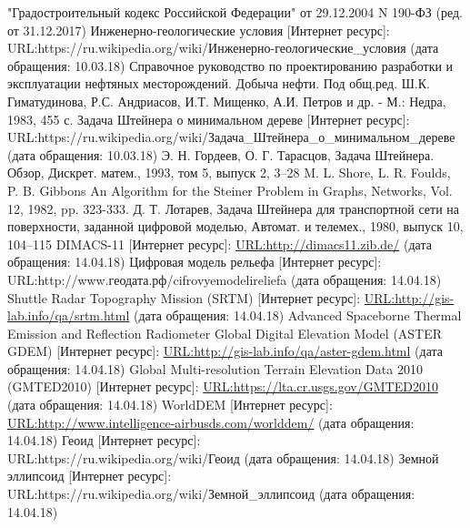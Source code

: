 \begin{thebibliography}{8}
	"Градостроительный кодекс Российской Федерации" от 29.12.2004 N 190-ФЗ (ред. от 31.12.2017)
	 Инженерно-геологические условия [Интернет ресурс]:\\
	URL:https://ru.wikipedia.org/wiki/Инженерно-геологические\_условия (дата обращения: 10.03.18)
	Справочное руководство по проектированию разработки и эксплуатации нефтяных месторождений. Добыча нефти. Под общ.ред. Ш.К. Гиматудинова, Р.С. Андриасов, И.Т. Мищенко, А.И. Петров и др. - М.: Недра, 1983, 455 с.
	 Задача Штейнера о минимальном дереве [Интернет ресурс]:\\
	URL:https://ru.wikipedia.org/wiki/Задача\_Штейнера\_о\_минимальном\_дереве (дата обращения: 10.03.18)
	Э. Н. Гордеев, О. Г. Тарасцов, Задача Штейнера. Обзор,	Дискрет. матем., 1993, том 5, выпуск 2, 3–28
	M. L. Shore, L. R. Foulds, P. B. Gibbons An Algorithm for the Steiner Problem in Graphs, Networks, Vol. 12, 1982, pp. 323-333.
	Д. Т. Лотарев, Задача Штейнера для транспортной сети на	поверхности, заданной цифровой моделью, Автомат. и телемех., 1980, выпуск 10, 104–115
	 DIMACS-11 [Интернет ресурс]:
	\url{URL:http://dimacs11.zib.de/} (дата обращения: 14.04.18)
	 Цифровая модель рельефа [Интернет ресурс]:\\
	URL:http://www.геодата.рф/cifrovyemodelireliefa (дата обращения: 14.04.18)
	 Shuttle Radar Topography Mission (SRTM) [Интернет ресурс]:
	\url{URL:http://gis-lab.info/qa/srtm.html} (дата обращения: 14.04.18)
	 Advanced Spaceborne Thermal Emission and Reflection Radiometer Global Digital Elevation Model (ASTER GDEM) [Интернет ресурс]:
	\url{URL:http://gis-lab.info/qa/aster-gdem.html} (дата обращения: 14.04.18)
	 Global Multi-resolution Terrain Elevation Data 2010 (GMTED2010) [Интернет ресурс]:
	\url{URL:https://lta.cr.usgs.gov/GMTED2010} (дата обращения: 14.04.18)
	 WorldDEM [Интернет ресурс]:
	\url{URL:http://www.intelligence-airbusds.com/worlddem/} (дата обращения: 14.04.18)
	 Геоид [Интернет ресурс]:\\
	URL:https://ru.wikipedia.org/wiki/Геоид (дата обращения: 14.04.18)
	 Земной эллипсоид [Интернет ресурс]:\\
	URL:https://ru.wikipedia.org/wiki/Земной\_эллипсоид (дата обращения: 14.04.18)

\end{thebibliography}
